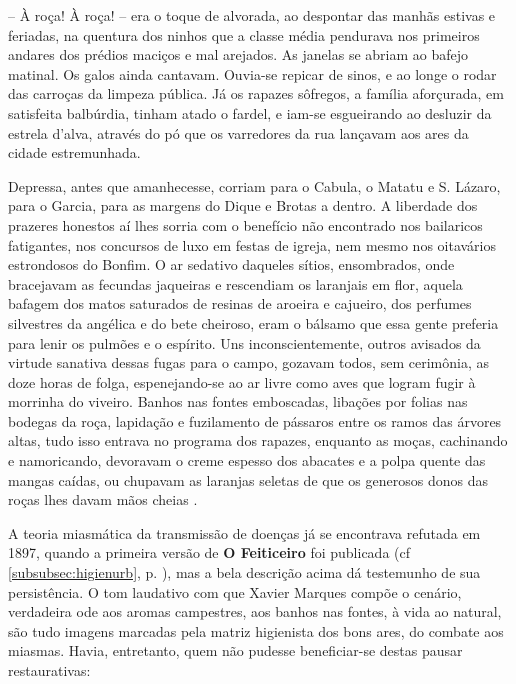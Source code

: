 \begin{citacao}
-- À roça! À roça! -- era o toque de alvorada, ao despontar das manhãs estivas e feriadas, na quentura dos ninhos que a classe média pendurava nos primeiros andares dos prédios maciços e mal arejados. As janelas se abriam ao bafejo matinal. Os galos ainda cantavam. Ouvia-se repicar de sinos, e ao longe o rodar das carroças da limpeza pública. Já os rapazes sôfregos, a família aforçurada, em satisfeita balbúrdia, tinham atado o fardel, e iam-se esgueirando ao desluzir da estrela d'alva, através do pó que os varredores da rua lançavam aos ares da cidade estremunhada.

Depressa, antes que amanhecesse, corriam para o Cabula, o Matatu e S. Lázaro, para o Garcia, para as margens do Dique e Brotas a dentro. A liberdade dos prazeres honestos aí lhes sorria com o benefício não encontrado nos bailaricos fatigantes, nos concursos de luxo em festas de igreja, nem mesmo nos oitavários estrondosos do Bonfim. O ar sedativo daqueles sítios, ensombrados, onde bracejavam as fecundas jaqueiras e rescendiam os laranjais em flor, aquela bafagem dos matos saturados de resinas de aroeira e cajueiro, dos perfumes silvestres da angélica e do bete cheiroso, eram o bálsamo que essa gente preferia para lenir os pulmões e o espírito. Uns inconscientemente, outros avisados da virtude sanativa dessas fugas para o campo, gozavam todos, sem cerimônia, as doze horas de folga, espenejando-se ao ar livre como aves que logram fugir à morrinha do viveiro. Banhos nas fontes emboscadas, libações por folias nas bodegas da roça, lapidação e fuzilamento de pássaros entre os ramos das árvores altas, tudo isso entrava no programa dos rapazes, enquanto as moças, cachinando e namoricando, devoravam o creme espesso dos abacates e a polpa quente das mangas caídas, ou chupavam as laranjas seletas de que os generosos donos das roças lhes davam mãos cheias \cite[pp.~3-4]{marques_feiticeiro_1975}.
\end{citacao}

A teoria miasmática da transmissão de doenças já se encontrava refutada em 1897, quando a primeira versão de \textbf{O Feiticeiro} foi publicada (cf \autoref{subsubsec:higienurb}, p. \pageref{subsubsec:higienurb}), mas a bela descrição acima dá testemunho de sua persistência. O tom laudativo com que Xavier Marques compõe o cenário, verdadeira ode aos aromas campestres, aos banhos nas fontes, à vida ao natural, são tudo imagens marcadas pela matriz higienista dos bons ares, do combate aos miasmas. Havia, entretanto, quem não pudesse beneficiar-se destas pausar restaurativas:

